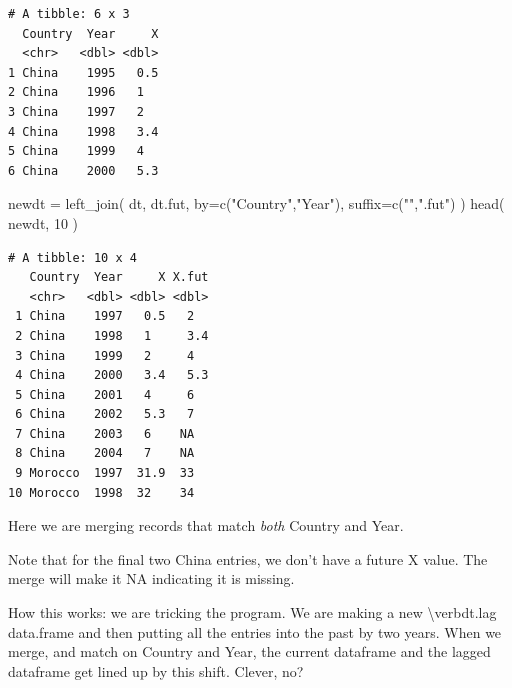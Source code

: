 \documentclass[
  letterpaper,
  DIV=11,
  numbers=noendperiod]{scrreprt}
\newenvironment{Shaded}{\begin{snugshade}}{\end{snugshade}}
\newcommand{\AttributeTok}[1]{\textcolor[rgb]{0.49,0.56,0.16}{#1}}
\newcommand{\DecValTok}[1]{\textcolor[rgb]{0.25,0.63,0.44}{#1}}
\newcommand{\FunctionTok}[1]{\textcolor[rgb]{0.02,0.16,0.49}{#1}}
\newcommand{\NormalTok}[1]{\textcolor[rgb]{0.00,0.44,0.13}{#1}}
\newcommand{\OtherTok}[1]{\textcolor[rgb]{0.00,0.44,0.13}{#1}}
\newcommand{\SpecialCharTok}[1]{\textcolor[rgb]{0.25,0.44,0.63}{#1}}
\newcommand{\StringTok}[1]{\textcolor[rgb]{0.25,0.44,0.63}{#1}}
\begin{document}
\begin{Shaded}
\end{Shaded}

\begin{verbatim}
# A tibble: 6 x 3
  Country  Year     X
  <chr>   <dbl> <dbl>
1 China    1995   0.5
2 China    1996   1  
3 China    1997   2  
4 China    1998   3.4
5 China    1999   4  
6 China    2000   5.3
\end{verbatim}

\begin{Shaded}
\begin{Highlighting}[]
\NormalTok{newdt }\OtherTok{=} \FunctionTok{left\_join}\NormalTok{( dt, dt.fut, }
                   \AttributeTok{by=}\FunctionTok{c}\NormalTok{(}\StringTok{"Country"}\NormalTok{,}\StringTok{"Year"}\NormalTok{), }\AttributeTok{suffix=}\FunctionTok{c}\NormalTok{(}\StringTok{""}\NormalTok{,}\StringTok{".fut"}\NormalTok{) )}
\FunctionTok{head}\NormalTok{( newdt, }\DecValTok{10}\NormalTok{ )}
\end{Highlighting}
\end{Shaded}

\begin{verbatim}
# A tibble: 10 x 4
   Country  Year     X X.fut
   <chr>   <dbl> <dbl> <dbl>
 1 China    1997   0.5   2  
 2 China    1998   1     3.4
 3 China    1999   2     4  
 4 China    2000   3.4   5.3
 5 China    2001   4     6  
 6 China    2002   5.3   7  
 7 China    2003   6    NA  
 8 China    2004   7    NA  
 9 Morocco  1997  31.9  33  
10 Morocco  1998  32    34  
\end{verbatim}

Here we are merging records that match \emph{both} Country and Year.

Note that for the final two China entries, we don't have a future X
value. The merge will make it NA indicating it is missing.

How this works: we are tricking the program. We are making a new
\textbackslash verb\textbar dt.lag\textbar{} data.frame and then putting
all the entries into the past by two years. When we merge, and match on
Country and Year, the current dataframe and the lagged dataframe get
lined up by this shift. Clever, no?
\end{document}
